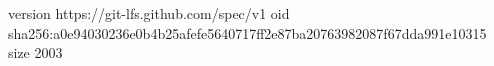 version https://git-lfs.github.com/spec/v1
oid sha256:a0e94030236e0b4b25afefe5640717ff2e87ba20763982087f67dda991e10315
size 2003
